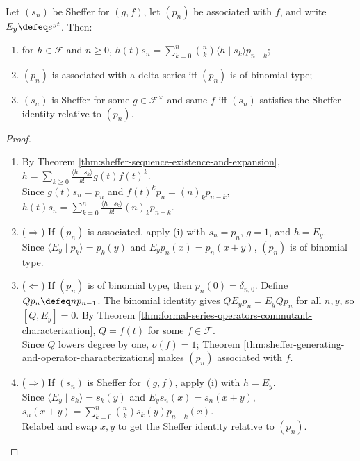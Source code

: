 \begin{theorem} \label{thm:sheffer-action-and-binomial-identities} \\
Let $(s_n)$ be Sheffer for $(g,f)$, let $(p_n)$ be associated with $f$, and
        write $E_y\defeq e^{yt}$. Then:
\begin{enumerate}[label=(\roman*)]
\setlength{\itemsep}{0pt}
\item for $h\in\mathscr{F}$ and $n\geq0$, $h(t)s_n=\sum\limits_{k=0}^{n}\binom{n}{k} \langle h\mid s_k\rangle p_{n-k}$;
\item $(p_n)$ is associated with a delta series iff $(p_n)$ is of binomial type;
\item $(s_n)$ is Sheffer for some $g\in\mathscr{F}^{\times}$ and same $f$ iff $(s_n)$ satisfies the Sheffer identity relative to $(p_n)$.
\end{enumerate}
\begin{proof}
\begin{enumerate}[label=(\roman*)]
\setlength{\itemsep}{0pt}
\item By Theorem \ref{thm:sheffer-sequence-existence-and-expansion}, $h=\sum\limits_{k\geq0}\frac{\langle h\mid s_k\rangle}{k!}g(t)f(t)^k$.\\
Since $g(t)s_n=p_n$ and $f(t)^kp_n=(n)_kp_{n-k}$, $h(t)s_n=\sum\limits_{k=0}^{n}\frac{\langle h\mid s_k\rangle}{k!}(n)_kp_{n-k}$.
\item[$(ii)$] ($\Rightarrow$) If $(p_n)$ is associated, apply (i) with $s_n=p_n$, $g=1$, and $h=E_y$.\\
Since $\langle E_y\mid p_k\rangle=p_k(y)$ and $E_yp_n(x)=p_n(x+y)$, $(p_n)$ is of binomial type.
\item[$(ii)$] ($\Leftarrow$) If $(p_n)$ is of binomial type, then $p_n(0)=\delta_{n,0}$. Define $Qp_n\defeq np_{n-1}$. The binomial identity gives $QE_y p_n=E_yQp_n$ for all $n,y$, so $[Q,E_y]=0$. By Theorem \ref{thm:formal-series-operators-commutant-characterization}, $Q=f(t)$ for some $f\in\mathscr{F}$.\\
Since $Q$ lowers degree by one, $o(f)=1$; Theorem \ref{thm:sheffer-generating-and-operator-characterizations} makes $(p_n)$ associated with $f$.
\item[$(iii)$] ($\Rightarrow$) If $(s_n)$ is Sheffer for $(g,f)$, apply (i) with $h=E_y$.\\
Since $\langle E_y\mid s_k\rangle=s_k(y)$ and $E_ys_n(x)=s_n(x+y)$, $s_n(x+y)=\sum\limits_{k=0}^{n}\binom{n}{k}s_k(y)p_{n-k}(x)$.\\
Relabel and swap $x,y$ to get the Sheffer identity relative to $(p_n)$.

\end{enumerate}
\end{proof}
\end{theorem}
